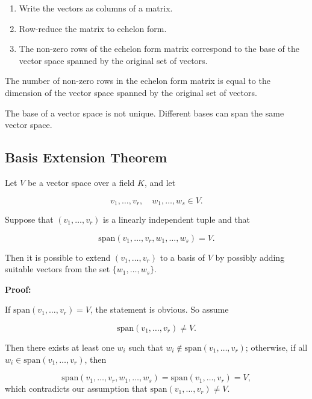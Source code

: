 \begin{enumerate}

	\item Write the vectors as columns of a matrix.

	\item Row-reduce the matrix to echelon form.

	\item The non-zero rows of the echelon form matrix correspond to the base of the vector space 
	      spanned by the original set of vectors.

\end{enumerate}

The number of non-zero rows in the echelon form matrix is equal to the dimension of the vector space 
spanned by the original set of vectors.
\vspace{\baselineskip}

The base of a vector space is not unique. Different bases can span the same vector space.

\subsection{Basis Extension Theorem}

Let \(V\) be a vector space over a field \(K\), and let 

\[
	v_1, \ldots, v_r,\quad w_1, \ldots, w_s \in V.
\]

Suppose that \((v_1, \ldots, v_r)\) is a linearly independent tuple and that

\[
	\text{span}(v_1, \ldots, v_r, w_1, \ldots, w_s) = V.
\]

Then it is possible to extend \((v_1, \ldots, v_r)\) to a basis of \(V\) by possibly adding suitable 
vectors from the set \(\{w_1, \ldots, w_s\}\).
\vspace{\baselineskip}

\textbf{Proof:}

If \(\text{span}(v_1, \ldots, v_r) = V\), the statement is obvious. So assume

\[
	\text{span}(v_1, \ldots, v_r) \neq V.
\]

Then there exists at least one \(w_i\) such that \(w_i \notin \text{span}(v_1, \ldots, v_r)\); 
otherwise, if all \(w_i \in \text{span}(v_1, \ldots, v_r)\), then

\[
	\text{span}(v_1, \ldots, v_r, w_1, \ldots, w_s) = \text{span}(v_1, \ldots, v_r) = V,
\]
which contradicts our assumption that \(\text{span}(v_1, \ldots, v_r) \neq V\).

